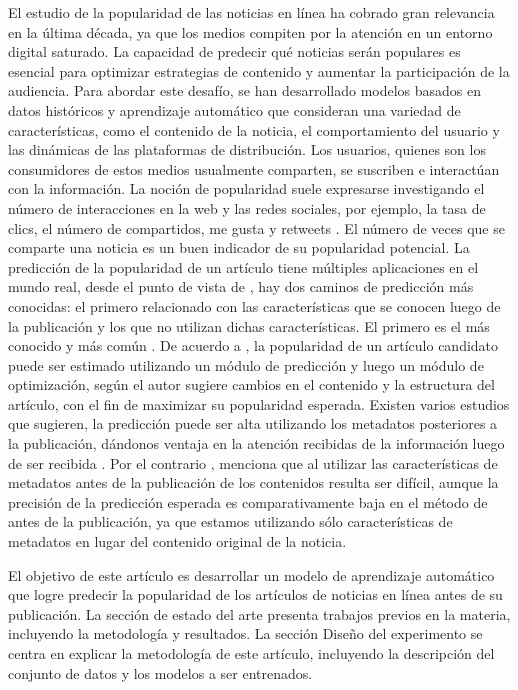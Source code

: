 \documentclass[
  number,
  preprint,
  3p,
  twocolumn]{elsarticle}
\begin{document}
El estudio de la popularidad de las noticias en línea ha cobrado gran
relevancia en la última década, ya que los medios compiten por la
atención en un entorno digital saturado. La capacidad de predecir qué
noticias serán populares es esencial para optimizar estrategias de
contenido y aumentar la participación de la audiencia. Para abordar este
desafío, se han desarrollado modelos basados en datos históricos y
aprendizaje automático que consideran una variedad de características,
como el contenido de la noticia, el comportamiento del usuario y las
dinámicas de las plataformas de distribución. Los usuarios, quienes son
los consumidores de estos medios usualmente comparten, se suscriben e
interactúan con la información. La noción de popularidad suele
expresarse investigando el número de interacciones en la web y las redes
sociales, por ejemplo, la tasa de clics, el número de compartidos, me
gusta y retweets \citep{Uddin2016}. El número de veces que se comparte
una noticia es un buen indicador de su popularidad potencial. La
predicción de la popularidad de un artículo tiene múltiples aplicaciones
en el mundo real, desde el punto de vista de \citep{Tarar2014a}, hay dos
caminos de predicción más conocidas: el primero relacionado con las
características que se conocen luego de la publicación y los que no
utilizan dichas características. El primero es el más conocido y más
común
\citep{Kaltenbrunner2007, Szabo2010, Lee2012, Ahmed2013, Tatar2014b}. De
acuerdo a \citep{Fernandes2015}, la popularidad de un artículo candidato
puede ser estimado utilizando un módulo de predicción y luego un módulo
de optimización, según el autor sugiere cambios en el contenido y la
estructura del artículo, con el fin de maximizar su popularidad
esperada. Existen varios estudios que sugieren, la predicción puede ser
alta utilizando los metadatos posteriores a la publicación, dándonos
ventaja en la atención recibidas de la información luego de ser recibida
\citep{Lee2012, Ahmed2013}. Por el contrario \citep{Fernandes2015},
menciona que al utilizar las características de metadatos antes de la
publicación de los contenidos resulta ser difícil, aunque la precisión
de la predicción esperada es comparativamente baja en el método de antes
de la publicación, ya que estamos utilizando sólo características de
metadatos en lugar del contenido original de la noticia.

El objetivo de este artículo es desarrollar un modelo de aprendizaje
automático que logre predecir la popularidad de los artículos de
noticias en línea antes de su publicación. La sección de estado del arte
presenta trabajos previos en la materia, incluyendo la metodología y
resultados. La sección Diseño del experimento se centra en explicar la
metodología de este artículo, incluyendo la descripción del conjunto de
datos y los modelos a ser entrenados.
\end{document}
